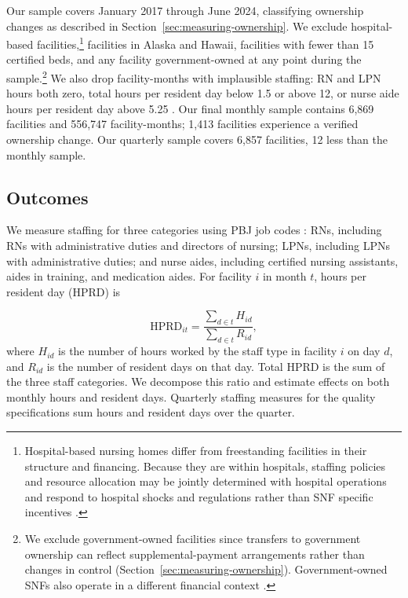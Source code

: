 \documentclass[12pt]{article}
\begin{document}
Our sample covers January 2017 through June 2024, classifying ownership changes as described in Section~\ref{sec:measuring-ownership}. We exclude hospital-based facilities,\footnote{Hospital-based nursing homes differ from freestanding facilities in their structure and financing. Because they are within hospitals, staffing policies and resource allocation may be jointly determined with hospital operations and respond to hospital shocks and regulations rather than SNF specific incentives \citep{MedPAC2026Report}.} facilities in Alaska and Hawaii, facilities with fewer than 15 certified beds, and any facility government-owned at any point during the sample.\footnote{We exclude government-owned facilities since transfers to government ownership can reflect supplemental-payment arrangements rather than changes in control (Section~\ref{sec:measuring-ownership}). Government-owned SNFs also operate in a different financial context \citep{MedPAC2026Report}.} We also drop facility-months with implausible staffing: RN and LPN hours both zero, total hours per resident day below 1.5 or above 12, or nurse aide hours per resident day above 5.25 \citep{cms_fivestar_2026}. Our final monthly sample contains 6,869 facilities and 556,747 facility-months; 1,413 facilities experience a verified ownership change. Our quarterly sample covers 6,857 facilities, 12 less than the monthly sample.

\subsection{Outcomes}

We measure staffing for three categories using PBJ job codes \citep{cms_fivestar_2026}: RNs, including RNs with administrative duties and directors of nursing; LPNs, including LPNs with administrative duties; and nurse aides, including certified nursing assistants, aides in training, and medication aides. For facility \(i\) in month \(t\), hours per resident day (HPRD) is

\begin{equation}
  \label{eq:hprd}
  \text{HPRD}_{it}
  =
  \frac{\displaystyle\sum_{d \in t} H_{id}}
       {\displaystyle\sum_{d \in t} R_{id}},
\end{equation}
where \(H_{id}\) is the number of hours worked by the staff type in facility \(i\) on day \(d\), and \(R_{id}\) is the number of resident days on that day. Total HPRD is the sum of the three staff categories. We decompose this ratio and estimate effects on both monthly hours and resident days. Quarterly staffing measures for the quality specifications sum hours and resident days over the quarter.
\end{document}
